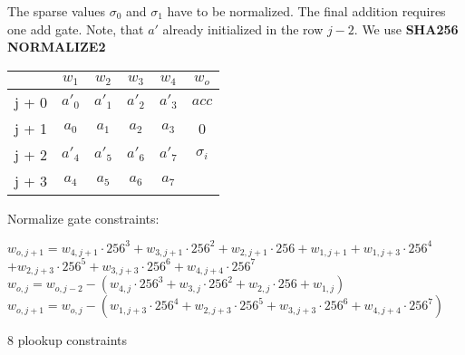 The sparse values $\sigma_0$ and $\sigma_1$ have to be normalized.
The final addition requires one add gate.
Note, that $a'$ already initialized in the row $j - 2$.
We use \textbf{SHA256 NORMALIZE2}
\begin{center}
\begin{tabular}{ c|c|c|c|c|c } 
  & $w_1$ & $w_2$ & $w_3$ & $w_4$ & $w_o$\\ 
 \hline
j + 0 & $a'_0$ & $a'_1$ & $a'_2$ & $a'_3$ &  $acc$\\ 
j + 1 & $a_0$ & $ a_1$ & $a_2$ & $a_3$ & 0\\
j + 2 & $a'_4$ & $a'_5$ & $a'_6$ & $a'_7$ & $\sigma_i$\\ 
j + 3 & $a_4$ & $ a_5$ & $a_6$ & $a_7$ &  \\
\end{tabular}
\end{center}

Normalize gate constraints:
\begin{center}
$w_{o,j+1} = w_{4,j+1} \cdot 256^3 + w_{3,j+1} \cdot 256^2 + w_{2,j+1} \cdot 256 + w_{1,j+1} 
	+ w_{1,j+3} \cdot 256^4$ \\
	$+ w_{2,j+3} \cdot 256^5+ w_{3,j+3} \cdot 256^6 + w_{4,j+4} \cdot 256^7$ \\
$w_{o,j} = w_{o, j - 2} - (w_{4,j} \cdot 256^3 + w_{3,j} \cdot 256^2 + w_{2,j} \cdot 256 + w_{1,j})$ \\
$w_{o,j+1} = w_{o,j} - ( w_{1,j+3} \cdot 256^4 + w_{2,j+3} \cdot 256^5+ w_{3,j+3} \cdot 256^6 + w_{4,j+4} \cdot 256^7)$

8 plookup constraints \\
\end{center}

